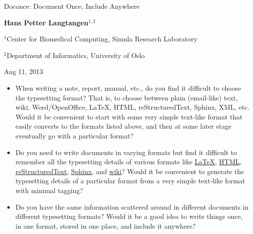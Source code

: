 \documentclass[%
oneside,                 %
final,                   %
10pt]{article}
\begin{document}




\begin{center}
{\LARGE\bf
\begin{spacing}{1.25}
Doconce: Document Once, Include Anywhere
\end{spacing}
}
\end{center}


\begin{center}
{\bf Hans Petter Langtangen${}^{1, 2}$} \\ [0mm]
\end{center}

\begin{center}
\centerline{{\small ${}^1$Center for Biomedical Computing, Simula Research Laboratory}}
\centerline{{\small ${}^2$Department of Informatics, University of Oslo}}
\end{center}


\begin{center}
Aug 11, 2013
\end{center}

\vspace{1cm}



\begin{itemize}
 \item When writing a note, report, manual, etc., do you find it difficult
   to choose the typesetting format? That is, to choose between plain
   (email-like) text, wiki, Word/OpenOffice, {\LaTeX}, HTML,
   reStructuredText, Sphinx, XML, etc.  Would it be convenient to
   start with some very simple text-like format that easily converts
   to the formats listed above, and then at some later stage
   eventually go with a particular format?

 \item Do you need to write documents in varying formats but find it
   difficult to remember all the typesetting details of various
   formats like \href{{http://refcards.com/docs/silvermanj/amslatex/LaTeXRefCard.v2.0.pdf}}{LaTeX}, \href{{http://www.htmlcodetutorial.com/}}{HTML}, \href{{http://docutils.sourceforge.net/docs/ref/rst/restructuredtext.html}}{reStructuredText}, \href{{http://sphinx.pocoo.org/contents.html}}{Sphinx}, and \href{{http://code.google.com/p/support/wiki/WikiSyntax}}{wiki}? Would it be convenient
   to generate the typesetting details of a particular format from a
   very simple text-like format with minimal tagging?

 \item Do you have the same information scattered around in different
   documents in different typesetting formats? Would it be a good idea
   to write things once, in one format, stored in one place, and
   include it anywhere?
\end{itemize}
\end{document}
